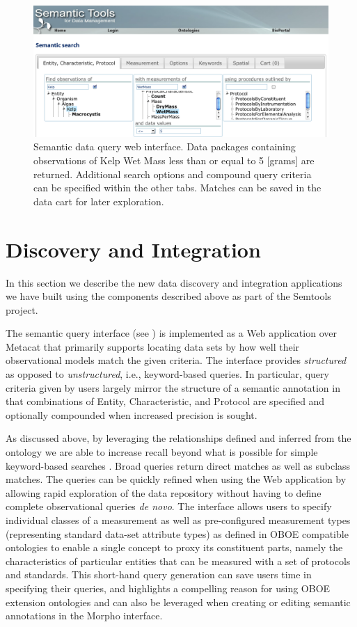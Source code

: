 \begin{figure}[!t]
\centering
\includegraphics[width=1.0\textwidth]{images/metacat-query.png}
\caption{Semantic data query web interface. Data packages containing observations of Kelp Wet Mass less than or equal to 5 [grams] are returned. Additional search options and compound query criteria can be specified within the other tabs. Matches can be saved in the data cart for later exploration.}
\label{fig:metacat-query}
\end{figure}


\section{Discovery and Integration}
\label{sec:application}

In this section we describe the new data discovery and integration
applications we have built using the components described above as
part of the Semtools project.

 The semantic query interface (see
) is implemented as a Web application over
Metacat that primarily supports locating data sets by how well their
observational models match the given criteria. The interface provides
\emph{structured} as opposed to \emph{unstructured}, i.e.,
keyword-based queries. In particular, query criteria given by users
largely mirror the structure of a semantic annotation in that
combinations of Entity, Characteristic, and Protocol are specified and
optionally compounded when increased precision is sought.

As discussed above, by leveraging the relationships defined and
inferred from the ontology we are able to increase recall beyond what
is possible for simple keyword-based searches
\cite{berkley09:_improv_data_discov_for_metad}. Broad queries return
direct matches as well as subclass matches. The queries can be quickly
refined when using the Web application by allowing rapid exploration
of the data repository without having to define complete observational
queries \emph{de novo}. The interface allows users to specify
individual classes of a measurement as well as pre-configured
measurement types (representing standard data-set attribute types) as
defined in OBOE compatible ontologies to enable a single concept to
proxy its constituent parts, namely the characteristics of particular
entities that can be measured with a set of protocols and
standards. This short-hand query generation can save users time in
specifying their queries, and highlights a compelling reason for using
OBOE extension ontologies and can also be leveraged when creating or
editing semantic annotations in the Morpho interface.

